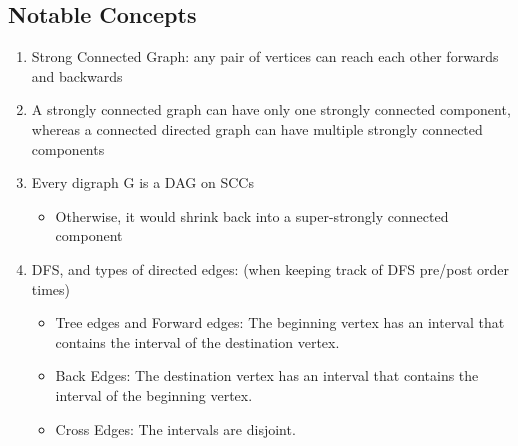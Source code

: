 \subsection{Notable Concepts}

\begin{enumerate}
    \item Strong Connected Graph: any pair of vertices can reach each other forwards and backwards

    \item A strongly connected graph can have only one strongly connected component, whereas a connected directed graph can have multiple strongly connected components

    \item Every digraph G is a DAG on SCCs
        \begin{itemize}
            \item Otherwise, it would shrink back into a super-strongly connected component
        \end{itemize}
    \item DFS, and types of directed edges: (when keeping track of DFS pre/post order times)
        \begin{itemize}
            \item Tree edges and Forward edges: The beginning vertex has an interval that contains the interval of the destination vertex.
            \item Back Edges: The destination vertex has an interval that contains the interval of the beginning vertex.
            \item Cross Edges: The intervals are disjoint.
        \end{itemize}

\end{enumerate}






